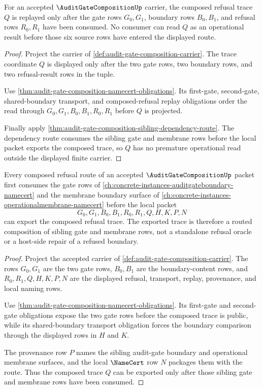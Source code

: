 \begin{theorem}
\label{thm:audit-gate-composition-operational-obligation}
For an accepted $\AuditGateCompositionUp$ carrier, the composed refusal trace $Q$ is replayed only after the gate rows $G_0,G_1$, boundary rows $B_0,B_1$, and refusal rows $R_0,R_1$ have been consumed. No consumer can read $Q$ as an operational result before those six source rows have entered the displayed route.
\end{theorem}
\begin{proof}
Project the carrier of \autoref{def:audit-gate-composition-carrier}. The trace coordinate $Q$ is displayed only after the two gate rows, two boundary rows, and two refusal-result rows in the tuple.

Use \autoref{thm:audit-gate-composition-namecert-obligations}. Its first-gate, second-gate, shared-boundary transport, and composed-refusal replay obligations order the read through $G_0,G_1,B_0,B_1,R_0,R_1$ before $Q$ is projected.

Finally apply \autoref{thm:audit-gate-composition-sibling-dependency-route}. The dependency route consumes the sibling gate and membrane rows before the local packet exports the composed trace, so $Q$ has no premature operational read outside the displayed finite carrier.
\end{proof}

\begin{theorem}
\label{thm:audit-gate-composition-sibling-dependency-route}
Every composed refusal route of an accepted $\AuditGateCompositionUp$ packet first consumes the gate rows of \autoref{ch:concrete-instances-auditgateboundary-namecert} and the membrane boundary surface of \autoref{ch:concrete-instances-operationalmembrane-namecert} before the local packet
$$
G_0,G_1,B_0,B_1,R_0,R_1,Q,H,K,P,N
$$
can export the composed refusal trace. The exported trace is therefore a routed composition of sibling gate and membrane rows, not a standalone refusal oracle or a host-side repair of a refused boundary.
\end{theorem}
\begin{proof}
Project the accepted carrier of \autoref{def:audit-gate-composition-carrier}. The rows $G_0,G_1$ are the two gate rows, $B_0,B_1$ are the boundary-content rows, and $R_0,R_1,Q,H,K,P,N$ are the displayed refusal, transport, replay, provenance, and local naming rows.

Use \autoref{thm:audit-gate-composition-namecert-obligations}. Its first-gate and second-gate obligations expose the two gate rows before the composed trace is public, while its shared-boundary transport obligation forces the boundary comparison through the displayed rows in $H$ and $K$.

The provenance row $P$ names the sibling audit-gate boundary and operational membrane surfaces, and the local $\NameCert$ row $N$ packages them with the route. Thus the composed trace $Q$ can be exported only after those sibling gate and membrane rows have been consumed.
\end{proof}


